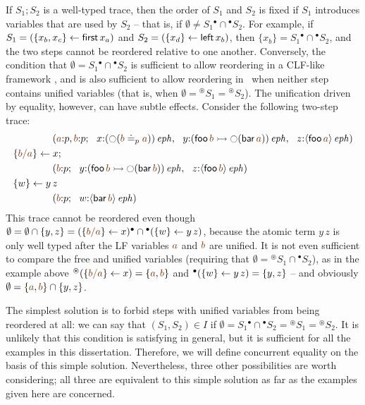 If $S_1; S_2$ is a well-typed trace, then the order of $S_1$ and $S_2$
is fixed if $S_1$ introduces variables that are used by $S_2$ -- that
is, if $\emptyset \neq S_1{^\bullet} \cap {^\bullet}S_2$. For example,
if $S_1 = (\{{x_b, x_c}\} \leftarrow {\sf first}\,x_a)$ and $S_2 =
(\{{x_d}\} \leftarrow {\sf left}\,x_b)$, then $\{x_b\} = S_1{^\bullet} \cap
{^\bullet}S_2$, and the two steps cannot be reordered relative to one
another.  Conversely, the condition that $\emptyset = S_1{^\bullet}
\cap {^\bullet}S_2$ is sufficient to allow reordering in a CLF-like
framework \cite{cervesato12trace}, and is also sufficient to allow
reordering in \sls~when neither step contains unified variables
(that is, when $\emptyset = {^\circledast}S_1 = {^\circledast}S_2$).
The unification driven by equality, however, can have subtle
effects. Consider the following two-step trace:
\begin{align*}
& \qquad\qquad
(\lf{a}{:}p, \lf{b}{:}p; ~~ x{:}\iseph{\left({\ocircle}(\lf{b} \doteq_p \lf{a})\right)}, ~~
 y{:}\iseph{\left({\sf foo}\,\lf{b} 
                 \lefti {\ocircle}({\sf bar}\, \lf{a})\right)}, ~~
 z{:}\iseph{\susp{{\sf foo}\,\lf{a}}})
\\
& \trstep{\lf{b/a}}{x};
\\
& \qquad\qquad
(\lf{b}{:}p; ~~ 
 y{:}\iseph{\left({\sf foo}\,\lf{b} 
                 \lefti {\ocircle}({\sf bar}\, \lf{b})\right)}, ~~
 z{:}\iseph{\susp{{\sf foo}\,\lf{b}}})
\\
& \trstep{w}{y\,z} 
\\
& \qquad\qquad
(\lf{b}{:}p; ~~ w{:}\iseph{\susp{{\sf bar}\,\lf{b}}})
\end{align*}
This trace cannot be reordered even though $\emptyset = \emptyset \cap
\{ y, z \} = (\trstep{\lf{b/a}}{x}){^\bullet} \cap
{^\bullet}(\trstep{w}{y\,z})$, because the atomic term $y\,z$ is only
well typed after the LF variables $\lf{a}$ and $\lf{b}$ are unified.
It is not even sufficient to compare the free and unified variables
(requiring that $\emptyset = {^\circledast}S_1 \cap {^\bullet}S_2$),
as in the example above ${^\circledast}(\trstep{\lf{b/a}}{x}) = \{
\lf{a},\lf{b} \}$ and ${^\bullet}(\{{w}\} \leftarrow {y\,z}) = \{ y, z \}$ --
and obviously $\emptyset = \{ \lf{a},\lf{b} \} \cap \{ y, z \}$.


The simplest solution is to forbid steps with unified variables from
being reordered at all: we can say that $(S_1,S_2) \in I$ if
$\emptyset = S_1{^\bullet} \cap {^\bullet}S_2 = {^\circledast}S_1 =
{^\circledast}S_2$. It is unlikely that this condition is satisfying
in general, but it is sufficient for all the examples in this
dissertation. Therefore, we will define concurrent
equality on the basis of this simple solution.  Nevertheless, three
other possibilities are worth considering; all three are
equivalent to this simple solution as far as the examples given here 
are concerned.

